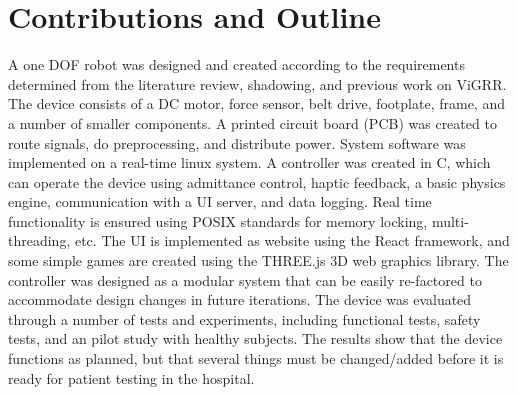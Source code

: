 \documentclass[12pt]{report}
\begin{document}





\section{Contributions and Outline}

A one DOF robot was designed and created according to the requirements determined from the literature review, shadowing, and previous work on ViGRR. The device consists of a DC motor, force sensor, belt drive, footplate, frame, and a number of smaller components. A printed circuit board (PCB) was created to route signals, do preprocessing, and distribute power. System software was implemented on a real-time linux system. A controller was created in C, which can operate the device using admittance control, haptic feedback, a basic physics engine, communication with a UI server, and data logging. Real time functionality is ensured using POSIX standards for memory locking, multi-threading, etc. The UI is implemented as website using the React framework, and some simple games are created using the THREE.js 3D web graphics library. The controller was designed as a modular system that can be easily re-factored to accommodate design changes in future iterations. The device was evaluated through a number of tests and experiments, including functional tests, safety tests, and an pilot study with healthy subjects. The results show that the device functions as planned, but that several things must be changed/added before it is ready for patient testing in the hospital.
\end{document}
